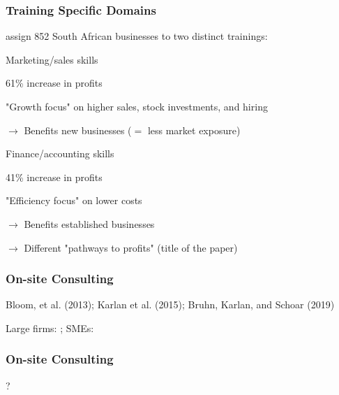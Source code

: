 \documentclass[hideothersubsections, usenames,dvipsnames,11pt]{beamer}
\newenvironment{itemize_2pt}{\itemize\addtolength{\itemsep}{2pt}}{\enditemize}
\newenvironment{enumerate_2pt}{\enumerate\addtolength{\itemsep}{2pt}}{\endenumerate}
\begin{document}
\begin{frame}
\frametitle{Training Specific Domains}

	\citet{Anderson2018} assign 852 South African businesses to two distinct trainings:
	\begin{enumerate_2pt}
	
		\item Marketing/sales skills
		\begin{itemize_2pt}
			\item 61\% increase in profits
			\item "Growth focus" on higher sales, stock investments, and hiring
			\item[] $\rightarrow$ Benefits new businesses ($=$ less market exposure)
		\end{itemize_2pt}		
		
		\item Finance/accounting skills
		
		\pause		
		
		\begin{itemize_2pt}
			\item 41\% increase in profits
			\item "Efficiency focus" on lower costs
			\item[] $\rightarrow$ Benefits established businesses
		\end{itemize_2pt}
		
		\item[] $\rightarrow$ Different "pathways to profits" (title of the paper)
	
	\end{enumerate_2pt}

\end{frame}



\begin{frame}
\frametitle{On-site Consulting}
	\begin{itemize_2pt}
	\item Bloom, et al. (2013); Karlan et al. (2015); Bruhn, Karlan, and Schoar (2019)
	\item Large firms: \citep{Bloom2013}; SMEs: \citep{Bruhn2018}
	\item \citep{Karlan2015} \citep{Bruhn2019}
	\vspace{0.1in}
	\end{itemize_2pt}
\end{frame}

\begin{frame}
\frametitle{On-site Consulting}
	\begin{itemize_2pt}
	\item ?
	\vspace{0.1in}
	\end{itemize_2pt}
\end{frame}
\end{document}
